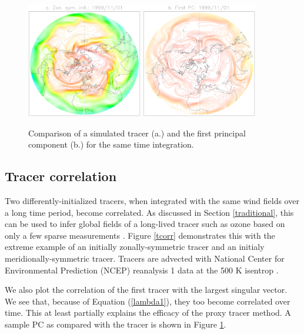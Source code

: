 \documentclass{article}
\begin{document}
\begin{figure}
\includegraphics[width=0.45\textwidth]{../pc_proxy/tsample.eps}
\includegraphics[width=0.45\textwidth]{../pc_proxy/pc1.eps}
\caption{Comparison of a simulated tracer (a.) and the first principal
component (b.) for the same time integration.}\label{pc1}
\end{figure}

\subsection{Tracer correlation}

Two differently-initialized tracers, when integrated with the same
wind fields over a long time period, become correlated.
As discussed in Section \ref{traditional},
this can be used to infer global fields of a long-lived tracer such as
ozone based on only a few sparse measurements 
\citep{Allen_Nakamura2003,Randall_etal2002}.
Figure \ref{tcorr} demonstrates this with the extreme example of an initially
zonally-symmetric tracer and an initialy meridionally-symmetric tracer.
Tracers are advected with National Center for Environmental Prediction
(NCEP) reanalysis 1 data at the 500 K isentrop \citep{Kalnay_etal1996}.

We also plot the correlation of the first tracer with the largest singular
vector.  We see that, because of Equation (\ref{lambda1}), they too become
correlated over time.
This at least partially explains the efficacy of the proxy tracer method.
A sample PC as compared with the tracer is shown in Figure \ref{pc1}.  
\end{document}
